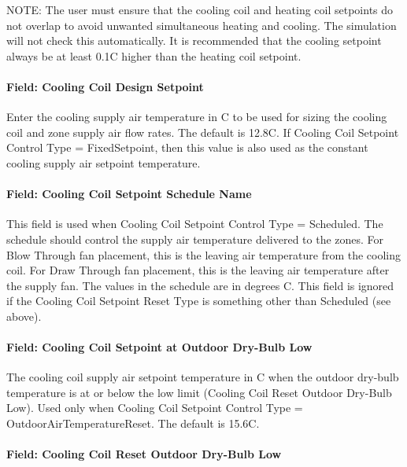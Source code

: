 NOTE: The user must ensure that the cooling coil and heating coil setpoints do not overlap to avoid unwanted simultaneous heating and cooling. The simulation will not check this automatically. It is recommended that the cooling setpoint always be at least 0.1C higher than the heating coil setpoint.

\paragraph{Field: Cooling Coil Design Setpoint}\label{field-cooling-coil-design-setpoint-3}

Enter the cooling supply air temperature in C to be used for sizing the cooling coil and zone supply air flow rates. The default is 12.8C. If Cooling Coil Setpoint Control Type = FixedSetpoint, then this value is also used as the constant cooling supply air setpoint temperature.

\paragraph{Field: Cooling Coil Setpoint Schedule Name}\label{field-cooling-coil-setpoint-schedule-name-4}

This field is used when Cooling Coil Setpoint Control Type = Scheduled. The schedule should control the supply air temperature delivered to the zones. For Blow Through fan placement, this is the leaving air temperature from the cooling coil. For Draw Through fan placement, this is the leaving air temperature after the supply fan. The values in the schedule are in degrees C. This field is ignored if the Cooling Coil Setpoint Reset Type is something other than Scheduled (see above).

\paragraph{Field: Cooling Coil Setpoint at Outdoor Dry-Bulb Low}\label{field-cooling-coil-setpoint-at-outdoor-dry-bulb-low-2}

The cooling coil supply air setpoint temperature in C when the outdoor dry-bulb temperature is at or below the low limit (Cooling Coil Reset Outdoor Dry-Bulb Low). Used only when Cooling Coil Setpoint Control Type = OutdoorAirTemperatureReset. The default is 15.6C.

\paragraph{Field: Cooling Coil Reset Outdoor Dry-Bulb Low}\label{field-cooling-coil-reset-outdoor-dry-bulb-low-2}

